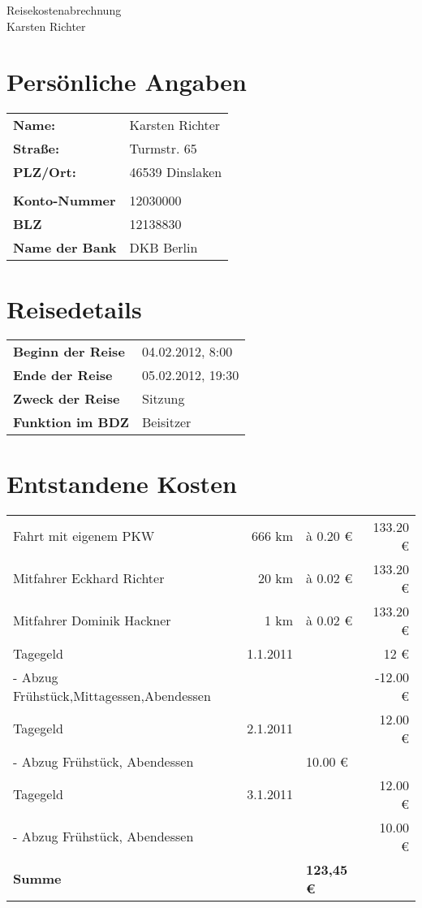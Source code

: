 \documentclass[a4paper,12pt]{article}
\begin{document}
\setlength{\parindent}{0mm}
\begin{center}
{\huge Reisekostenabrechnung}\\
{\large Karsten Richter} \\
\end{center}

%
\section{Persönliche Angaben}
\begin{tabular}[t]{ll}
\textbf{Name:} & Karsten Richter \\
\textbf{Straße:} & Turmstr. 65 \\
\textbf{PLZ/Ort:} & 46539 Dinslaken \\
\\
\textbf{Konto-Nummer} & 12030000 \\
\textbf{BLZ} & 12138830 \\
\textbf{Name der Bank} & DKB Berlin \\
\end{tabular}

\section{Reisedetails}
\begin{tabular}[t]{ll}
\textbf{Beginn der Reise} & 04.02.2012, 8:00 \\
\textbf{Ende der Reise} & 05.02.2012, 19:30 \\
\textbf{Zweck der Reise} & Sitzung \\
\textbf{Funktion im BDZ} &  Beisitzer \\
\end{tabular}
\section{Entstandene Kosten}
\begin{tabular}[t]{lrlr}
Fahrt mit eigenem PKW & 666 km & à 0.20 € & 133.20 € \\
Mitfahrer Eckhard Richter & 20 km & à 0.02 € & 133.20 € \\
Mitfahrer Dominik Hackner & 1 km & à 0.02 € & 133.20 € \\
Tagegeld & 1.1.2011  & & 12 € \\
- Abzug Frühstück,Mittagessen,Abendessen & & & -12.00 € \\
Tagegeld & 2.1.2011 & & 12.00 € \\
- Abzug Frühstück, Abendessen & & 10.00 € \\
Tagegeld & 3.1.2011 & & 12.00 € \\
- Abzug Frühstück, Abendessen & & & 10.00 € \\
\hline
\textbf{Summe} & & \textbf{123,45 €} \\
\hline
\hline
\end{tabular} \\
\vspace{1cm}
\end{document}
